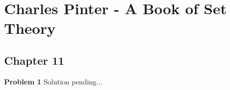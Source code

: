 \documentclass{article}
\begin{document}
\section*{Charles Pinter - A Book of Set Theory}
\subsection*{Chapter 11}

\textbf{Problem 1}
Solution pending...
\end{document}
